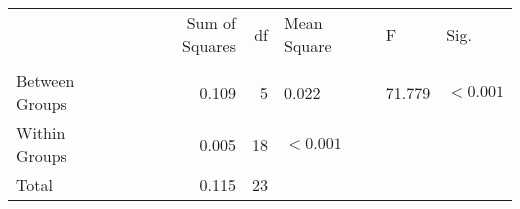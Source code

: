 \begin{tabular}{lrrlll}
\toprule
 & Sum of Squares & df & Mean Square & F & Sig. \\
 &  &  &  &  &  \\
\midrule
Between Groups & 0.109 & 5 & 0.022 & 71.779 & $< 0.001$ \\
Within Groups & 0.005 & 18 & $< 0.001$ &  &  \\
Total & 0.115 & 23 &  &  &  \\
\bottomrule
\end{tabular}
